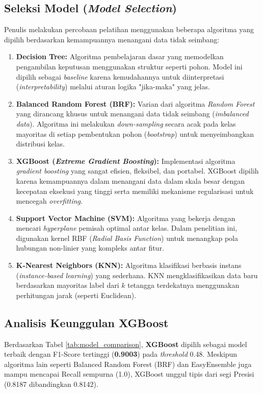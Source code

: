 \subsection{Seleksi Model (\textit{Model Selection})}
Penulis melakukan percobaan pelatihan menggunakan beberapa algoritma yang dipilih berdasarkan kemampuannya menangani data tidak seimbang:
\begin{enumerate}
    \item \textbf{Decision Tree:} Algoritma pembelajaran dasar yang memodelkan pengambilan keputusan menggunakan struktur seperti pohon. Model ini dipilih sebagai \textit{baseline} karena kemudahannya untuk diinterpretasi (\textit{interpretability}) melalui aturan logika "jika-maka" yang jelas.
    \item \textbf{Balanced Random Forest (BRF):} Varian dari algoritma \textit{Random Forest} yang dirancang khusus untuk menangani data tidak seimbang (\textit{imbalanced data}). Algoritma ini melakukan \textit{down-sampling} secara acak pada kelas mayoritas di setiap pembentukan pohon (\textit{bootstrap}) untuk menyeimbangkan distribusi kelas.
    \item \textbf{XGBoost (\textit{Extreme Gradient Boosting}):} Implementasi algoritma \textit{gradient boosting} yang sangat efisien, fleksibel, dan portabel. XGBoost dipilih karena kemampuannya dalam menangani data dalam skala besar dengan kecepatan eksekusi yang tinggi serta memiliki mekanisme regularisasi untuk mencegah \textit{overfitting}.
    \item \textbf{Support Vector Machine (SVM):} Algoritma yang bekerja dengan mencari \textit{hyperplane} pemisah optimal antar kelas. Dalam penelitian ini, digunakan kernel RBF (\textit{Radial Basis Function}) untuk menangkap pola hubungan non-linier yang kompleks antar fitur.
    \item \textbf{K-Nearest Neighbors (KNN):} Algoritma klasifikasi berbasis instans (\textit{instance-based learning}) yang sederhana. KNN mengklasifikasikan data baru berdasarkan mayoritas label dari $k$ tetangga terdekatnya menggunakan perhitungan jarak (seperti Euclidean).
\end{enumerate}


\subsection{Analisis Keunggulan XGBoost}
Berdasarkan Tabel \ref{tab:model_comparison}, \textbf{XGBoost} dipilih sebagai model terbaik dengan F1-Score tertinggi (\textbf{0.9003}) pada \textit{threshold} 0.48. Meskipun algoritma lain seperti Balanced Random Forest (BRF) dan EasyEnsemble juga mampu mencapai Recall sempurna (1.0), XGBoost unggul tipis dari segi Presisi (0.8187 dibandingkan 0.8142).

